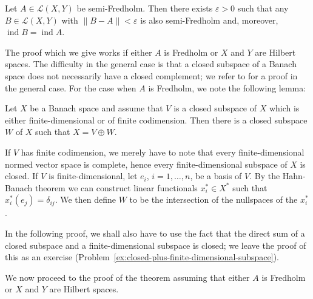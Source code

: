 \begin{Theorem}
\label{thm:semi-fredholm-index-local-stability}
Let $A\in\mathcal{L}(X,Y)$ be semi-Fredholm. Then there exists $\varepsilon>0$ such that any $B\in\mathcal{L}(X,Y)$ with $\|B-A\|<\varepsilon$ is also semi-Fredholm and, moreover, $\operatorname{ind}B=\operatorname{ind}A$.
\end{Theorem}

The proof which we give works if either $A$ is Fredholm or $X$ and $Y$ are Hilbert spaces. The difficulty in the general case is that a closed subspace of a Banach space does not necessarily have a closed complement; we refer to \cite{Ka} for a proof in the general case. For the case when $A$ is Fredholm, we note the following lemma:

\begin{Lemma}
\label{lem:finite-dimension-or-codimension-closed-complement}
Let $X$ be a Banach space and assume that $V$ is a closed subspace of $X$ which is either finite-dimensional or of finite codimension. Then there is a closed subspace $W$ of $X$ such that $X=V\oplus W$.
\end{Lemma}

\begin{Proof}
If $V$ has finite codimension, we merely have to note that every finite-dimensional normed vector space is complete, hence every finite-dimensional subspace of $X$ is closed. If $V$ is finite-dimensional, let $e_i$, $i=1,\ldots,n$, be a basis of $V$. By the Hahn-Banach theorem we can construct linear functionals $x_i^*\in X^*$ such that $x_i^*(e_j)=\delta_{ij}$. We then define $W$ to be the intersection of the nullspaces of the $x_i^*$.
\end{Proof}

In the following proof, we shall also have to use the fact that the direct sum of a closed subspace and a finite-dimensional subspace is closed; we leave the proof of this as an exercise (Problem~\ref{ex:closed-plus-finite-dimensional-subspace}).

We now proceed to the proof of the theorem assuming that either $A$ is Fredholm or $X$ and $Y$ are Hilbert spaces.

